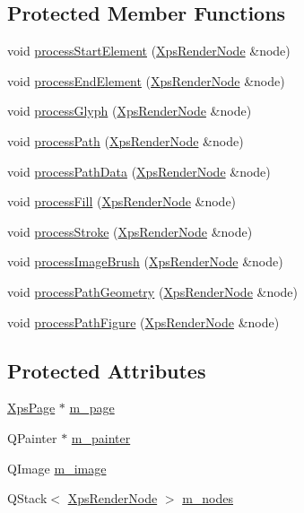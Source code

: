 \subsection*{Protected Member Functions}
\begin{DoxyCompactItemize}
\item 
void \hyperlink{classXpsHandler_aedb472a41dbaf8dc98f9c56082e20be9}{process\+Start\+Element} (\hyperlink{classXpsRenderNode}{Xps\+Render\+Node} \&node)
\item 
void \hyperlink{classXpsHandler_a128698f7127d6685e4ef8b0a548f3e86}{process\+End\+Element} (\hyperlink{classXpsRenderNode}{Xps\+Render\+Node} \&node)
\item 
void \hyperlink{classXpsHandler_a04b3024d155c9df20b3843e27014ff2c}{process\+Glyph} (\hyperlink{classXpsRenderNode}{Xps\+Render\+Node} \&node)
\item 
void \hyperlink{classXpsHandler_a7e906e018c5e746d79a0ae796b1734a3}{process\+Path} (\hyperlink{classXpsRenderNode}{Xps\+Render\+Node} \&node)
\item 
void \hyperlink{classXpsHandler_a0d8078f72932635d0176df232ca5dd5b}{process\+Path\+Data} (\hyperlink{classXpsRenderNode}{Xps\+Render\+Node} \&node)
\item 
void \hyperlink{classXpsHandler_aa84f158c104a06c9a2ab85dc52507d4b}{process\+Fill} (\hyperlink{classXpsRenderNode}{Xps\+Render\+Node} \&node)
\item 
void \hyperlink{classXpsHandler_a5942a8cb7eae345d4a657f4f2e9e5f53}{process\+Stroke} (\hyperlink{classXpsRenderNode}{Xps\+Render\+Node} \&node)
\item 
void \hyperlink{classXpsHandler_a7b84e307ae7cb8b1d584616367a3bffe}{process\+Image\+Brush} (\hyperlink{classXpsRenderNode}{Xps\+Render\+Node} \&node)
\item 
void \hyperlink{classXpsHandler_af9c8dd42a00347185710e1d124f13b4e}{process\+Path\+Geometry} (\hyperlink{classXpsRenderNode}{Xps\+Render\+Node} \&node)
\item 
void \hyperlink{classXpsHandler_adabc205b6b381b8938613866df4e988a}{process\+Path\+Figure} (\hyperlink{classXpsRenderNode}{Xps\+Render\+Node} \&node)
\end{DoxyCompactItemize}
\subsection*{Protected Attributes}
\begin{DoxyCompactItemize}
\item 
\hyperlink{classXpsPage}{Xps\+Page} $\ast$ \hyperlink{classXpsHandler_a57252ea44adece639b38d84237222d7f}{m\+\_\+page}
\item 
Q\+Painter $\ast$ \hyperlink{classXpsHandler_a2db77df5312274e6f1d7e274b45c9d21}{m\+\_\+painter}
\item 
Q\+Image \hyperlink{classXpsHandler_aac7da032d9b9577bf8f1aa5194e40ba0}{m\+\_\+image}
\item 
Q\+Stack$<$ \hyperlink{classXpsRenderNode}{Xps\+Render\+Node} $>$ \hyperlink{classXpsHandler_ac1147d386794d189fd0fe4a904e74f62}{m\+\_\+nodes}
\end{DoxyCompactItemize}
